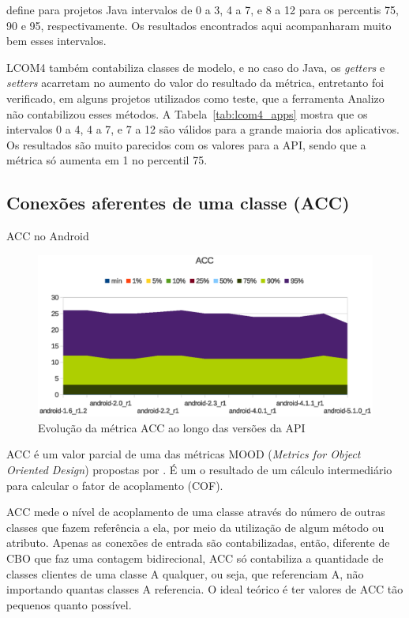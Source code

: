  define para projetos Java intervalos de 0 a 3, 4 a 7, e 8 a 12 para os percentis 75, 90 e 95, respectivamente. Os resultados encontrados aqui acompanharam muito bem esses intervalos.

LCOM4 também contabiliza classes de modelo, e no caso do Java, os \textit{getters} e \textit{setters} acarretam no aumento do valor do resultado da métrica\cite{meirelles2013}, entretanto foi verificado, em alguns projetos utilizados como teste, que a ferramenta Analizo não contabilizou esses métodos. A Tabela~\ref{tab:lcom4_apps} mostra que os intervalos 0 a 4, 4 a 7, e 7 a 12 são válidos para a grande maioria dos aplicativos. Os resultados são muito parecidos com os valores para a API, sendo que a métrica só aumenta em 1 no percentil 75.

\subsection{Conexões aferentes de uma classe (ACC)}

\begin{table}[!htb]
\centering
{}

\caption{ACC no Android}
\label{tab:acc_android}
\end{table}

\begin{figure}[!htb]
\centering
\includegraphics [keepaspectratio=true,scale=0.85]{figuras/graphs/acc_android.eps}
\caption{Evolução da métrica ACC ao longo das versões da API}
\label{fig:acc_android}
\end{figure}

ACC é um valor parcial de uma das métricas MOOD (\textit{Metrics for Object Oriented Design}) propostas por . É um o resultado de um cálculo intermediário para calcular o fator de acoplamento (COF). 

ACC mede o nível de acoplamento de uma classe através do número de outras classes que fazem referência a ela, por meio da utilização de algum método ou atributo. Apenas as conexões de entrada são contabilizadas, então, diferente de CBO que faz uma contagem bidirecional, ACC só contabiliza a quantidade de classes clientes de uma classe A qualquer, ou seja, que referenciam A, não importando quantas classes A referencia. O ideal teórico é ter valores de ACC tão pequenos quanto possível.


